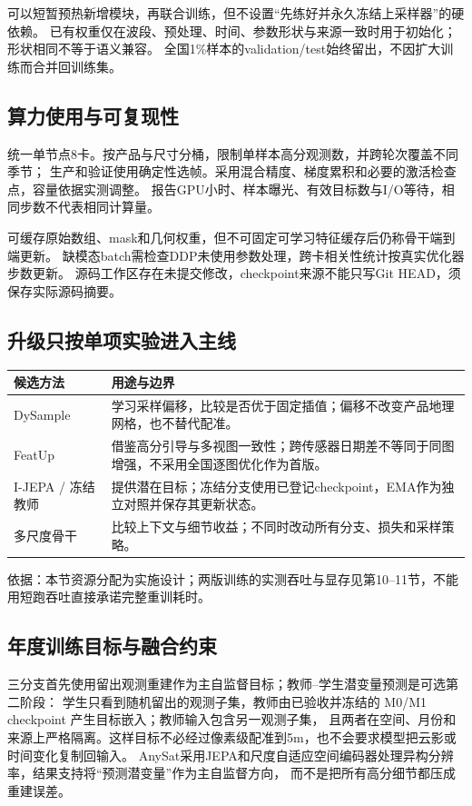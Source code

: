 \documentclass[UTF8,fontset=fandol,zihao=5,a4paper]{ctexart}
\newcommand{\source}[1]{\par{\footnotesize\color{muted}依据：#1}\par}
\begin{document}
可以短暂预热新增模块，再联合训练，但不设置“先练好并永久冻结上采样器”的硬依赖。
已有权重仅在波段、预处理、时间、参数形状与来源一致时用于初始化；形状相同不等于语义兼容。
全国1\%样本的validation/test始终留出，不因扩大训练而合并回训练集。

\subsection{算力使用与可复现性}
统一单节点8卡。按产品与尺寸分桶，限制单样本高分观测数，并跨轮次覆盖不同季节；
生产和验证使用确定性选帧。采用混合精度、梯度累积和必要的激活检查点，容量依据实测调整。
报告GPU小时、样本曝光、有效目标数与I/O等待，相同步数不代表相同计算量。

可缓存原始数组、mask和几何权重，但不可固定可学习特征缓存后仍称骨干端到端更新。
缺模态batch需检查DDP未使用参数处理，跨卡相关性统计按真实优化器步数更新。
源码工作区存在未提交修改，checkpoint来源不能只写Git HEAD，须保存实际源码摘要。

\subsection{升级只按单项实验进入主线}
\noindent\begin{tabularx}{\linewidth}{@{}p{3cm}Y@{}}
\toprule 候选方法 & 用途与边界\\\midrule
DySample\cite{dysample} & 学习采样偏移，比较是否优于固定插值；偏移不改变产品地理网格，也不替代配准。\\
FeatUp\cite{featup} & 借鉴高分引导与多视图一致性；跨传感器日期差不等同于同图增强，不采用全国逐图优化作为首版。\\
I-JEPA / 冻结教师\cite{ijepa} & 提供潜在目标；冻结分支使用已登记checkpoint，EMA作为独立对照并保存其更新状态。\\
多尺度骨干 & 比较上下文与细节收益；不同时改动所有分支、损失和采样策略。\\\bottomrule
\end{tabularx}
\source{本节资源分配为实施设计；两版训练的实测吞吐与显存见第10--11节，不能用短跑吞吐直接承诺完整重训耗时。}

\subsection{年度训练目标与融合约束}
三分支首先使用留出观测重建作为主自监督目标；教师--学生潜变量预测是可选第二阶段：
学生只看到随机留出的观测子集，教师由已验收并冻结的 M0/M1 checkpoint 产生目标嵌入；教师输入包含另一观测子集，
且两者在空间、月份和来源上严格隔离。这样目标不必经过像素级配准到5m，也不会要求模型把云影或时间变化复制回输入。
AnySat采用JEPA和尺度自适应空间编码器处理异构分辨率，结果支持将“预测潜变量”作为主自监督方向，
而不是把所有高分细节都压成重建误差\cite{anysat}。
\end{document}
